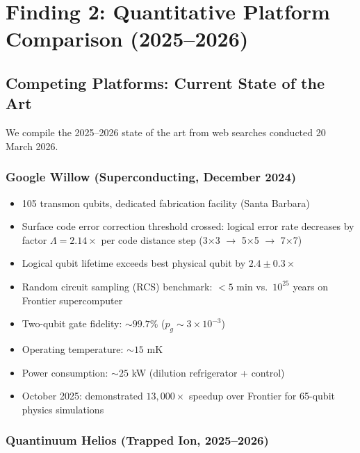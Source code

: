 \documentclass[11pt]{article}
\theoremstyle{definition}
\theoremstyle{remark}
\newcommand{\ee}[1]{\times 10^{#1}}
\begin{document}
\section{Finding 2: Quantitative Platform Comparison (2025--2026)}
\label{sec:platform-comparison}

\subsection{Competing Platforms: Current State of the Art}
\label{sec:competing-platforms}

We compile the 2025--2026 state of the art from web searches conducted
20 March 2026.

\subsubsection{Google Willow (Superconducting, December 2024)}

\begin{itemize}[nosep]
\item 105 transmon qubits, dedicated fabrication facility (Santa Barbara)
\item Surface code error correction threshold crossed: logical error
  rate decreases by factor $\Lambda = 2.14\times$ per code distance
  step (3$\times$3 $\to$ 5$\times$5 $\to$ 7$\times$7)
\item Logical qubit lifetime exceeds best physical qubit by
  $2.4 \pm 0.3\times$
\item Random circuit sampling (RCS) benchmark: $<5$ min vs.\ $10^{25}$
  years on Frontier supercomputer
\item Two-qubit gate fidelity: $\sim 99.7\%$ ($p_g \sim 3\ee{-3}$)
\item Operating temperature: $\sim 15$ mK
\item Power consumption: $\sim 25$ kW (dilution refrigerator + control)
\item October 2025: demonstrated $13{,}000\times$ speedup over Frontier
  for 65-qubit physics simulations
\end{itemize}

\subsubsection{Quantinuum Helios (Trapped Ion, 2025--2026)}
\end{document}
